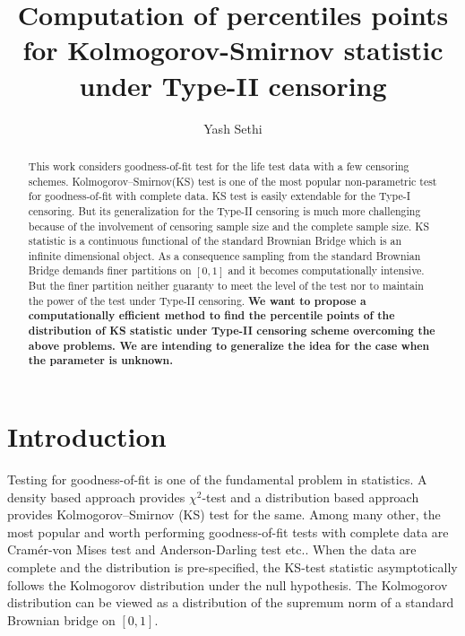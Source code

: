 \documentclass[12pt, reqno]{amsart}
\begin{document}
\title[KS test under Type-II censoring]{Computation of percentiles points for Kolmogorov-Smirnov statistic under Type-II censoring }
\author{Yash Sethi}  
\address{Department of Mathematics  Indian Institute of Technology Kharagpur, India-721302}


 
\begin{abstract}
    This work considers goodness-of-fit test  for the life test data with a few censoring schemes. Kolmogorov–Smirnov(KS) test is one of the most popular  non-parametric test  for goodness-of-fit with complete data. KS test  is easily extendable for the Type-I censoring. But its generalization  for the Type-II censoring  is much more challenging because of the involvement of censoring sample size and the complete sample size. KS statistic is a continuous functional of the standard Brownian Bridge which is an infinite dimensional object.   As  a consequence  sampling from the standard Brownian Bridge  demands finer partitions  on $[0,1]$ and it becomes computationally intensive. But the finer partition neither  guaranty  to meet the level of the test nor to maintain the power of the test under Type-II censoring. {\bf We want to propose a computationally efficient  method to find the percentile points of the distribution of KS statistic under Type-II censoring scheme  overcoming the above problems. We are intending to generalize the idea for the case when the parameter is unknown.  
 }
\end{abstract}

\maketitle


 \tableofcontents{}
 \vspace{1cm}
 \newpage




\section{Introduction}
Testing for goodness-of-fit is one of the  fundamental problem in statistics.
A density based approach provides $\chi^2$-test and a distribution based approach provides Kolmogorov–Smirnov (KS) test for the same.  Among many other, 
the  most popular and worth performing  goodness-of-fit   tests with complete data are Cram\'{e}r-von Mises test and Anderson-Darling test etc.. When the data are complete and the distribution is pre-specified, the KS-test statistic asymptotically follows the Kolmogorov distribution under the null hypothesis. The Kolmogorov distribution can be viewed as a distribution of the  supremum norm of a standard Brownian bridge on $[0,1]$. 
\end{document}
